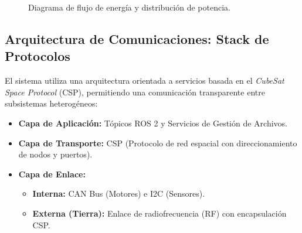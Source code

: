 \begin{figure}[H]
    \centering
    \shorthandoff{>}\shorthandoff{<}
    \shorthandon{>}\shorthandon{<}
    \caption{Diagrama de flujo de energía y distribución de potencia.}
    \label{fig:flujo_energia}
\end{figure}

\subsection{Arquitectura de Comunicaciones: Stack de Protocolos}
El sistema utiliza una arquitectura orientada a servicios basada en el \textit{CubeSat Space Protocol} (CSP), permitiendo una comunicación transparente entre subsistemas heterogéneos:

\begin{itemize}
    \item \textbf{Capa de Aplicación:} Tópicos ROS 2 y Servicios de Gestión de Archivos.
    \item \textbf{Capa de Transporte:} CSP (Protocolo de red espacial con direccionamiento de nodos y puertos).
    \item \textbf{Capa de Enlace:} 
        \begin{itemize}
            \item \textbf{Interna:} CAN Bus (Motores) e I2C (Sensores).
            \item \textbf{Externa (Tierra):} Enlace de radiofrecuencia (RF) con encapsulación CSP.
        \end{itemize}
\end{itemize}

